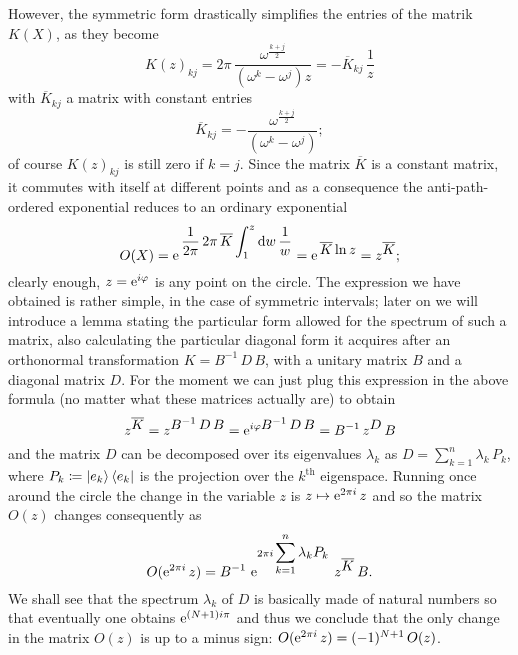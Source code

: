  However, the symmetric form drastically simplifies 
 the entries of the matrik $K(X)$, as they become 
 \begin{equation}
  {K(z)}_{kj}= 2\pi\,\frac{\omega^{\frac{k+j}{2}}}
  {(\omega^k-\omega^j)z}=-\overline{K}_{kj}\,\frac{1}{z}
 \end{equation}
 with $\overline{K}_{kj}$ a matrix with constant entries
 \[
 \overline{K}_{kj}=-\frac{\omega^{\frac{k+j}{2}}}
  {(\omega^k-\omega^j)};
 \]
 of course ${K(z)}_{kj}$ is still zero if $k=j$.
 Since the matrix $\overline{K}$ is a constant matrix, it
 commutes with itself at different points and as a consequence
 the anti-path-ordered exponential reduces to an ordinary
 exponential
 \begin{equation}
 O(X)=\operatorname{e}^{\displaystyle{\,\frac{1}{2\pi}\,2\pi\,\overline{K}
 \int_1^z \textrm{d}w\,\frac{1}{w}}}
 =\operatorname{e}^{\displaystyle{\,\overline{K}\ln z}}=z^{\displaystyle{\overline{K}}};
 \end{equation}
 clearly enough, $z=\operatorname{e}^{i\varphi}$ is any point on the
 circle. The expression we have obtained is rather simple,
 in the case of symmetric intervals; later on we will
 introduce a lemma stating the particular form allowed
 for the spectrum of such a matrix, also calculating
 the particular diagonal form it acquires after an
 orthonormal transformation $K=B^{-1}\,D\,B$, with 
 a unitary matrix $B$ and a diagonal matrix $D$. 
 For the moment we can just plug this expression in the 
 above formula (no matter what these matrices actually are)
 to obtain 
 \[
 z^{\displaystyle{\overline{K}}}=
 z^{\displaystyle{B^{-1}\,D\,B}}=
 \operatorname{e}^{i\varphi\displaystyle{B^{-1}\,D\,B}}=
 B^{-1}\,z^{\displaystyle{D}}\,B
 \]
 and the matrix $D$ can be decomposed over its 
 eigenvalues $\lambda_k$ as $D=\sum_{k=1}^{n}
 \lambda_k\,P_k$, where $P_k\coloneqq \ket{e_k}\bra{e_k}$ 
 is the projection over the $k^{\textrm{th}}$ eigenspace.
 Running once around the circle the change in the variable 
 $z$ is $z\mapsto \operatorname{e}^{2\pi i}z$ and so the matrix $O(z)$
 changes consequently as
 \[
 O(\operatorname{e}^{2\pi i}z)=B^{-1}\,\operatorname{e}^{2\pi i\,
 \displaystyle{\sum_{k=1}^n\lambda_k P_k}}
 \,z^{\displaystyle{\overline{K}}}\,B.
 \]
 We shall see that the spectrum $\lambda_k$ of $D$
 is basically made of natural numbers so that eventually
 one obtains $\operatorname{e}^{(N+1)i\pi}$ and thus we 
 conclude that the only change in the matrix $O(z)$ 
 is up to a minus sign: $O(\operatorname{e}^{2\pi i}z)=(-1)^{N+1}\,O(z)$.
 
